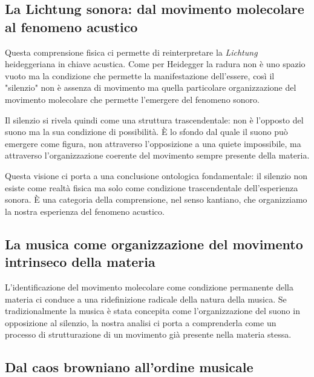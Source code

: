 \documentclass[a4paper,11pt]{article}
\begin{document}
\subsection{La Lichtung sonora: dal movimento molecolare al fenomeno acustico}\hypertarget{la-lichtung-sonora-dal-movimento-molecolare-al-fenomeno-acustico}{}\label{la-lichtung-sonora-dal-movimento-molecolare-al-fenomeno-acustico}

Questa comprensione fisica ci permette di reinterpretare la \emph{Lichtung}
heideggeriana in chiave acustica. Come per Heidegger la radura non è uno
spazio vuoto ma la condizione che permette la manifestazione
dell'essere, così il "silenzio" non è assenza di movimento ma quella
particolare organizzazione del movimento molecolare che permette
l'emergere del fenomeno sonoro.

Il silenzio si rivela quindi come una struttura trascendentale: non è
l'opposto del suono ma la sua condizione di possibilità. È lo sfondo dal
quale il suono può emergere come figura, non attraverso l'opposizione a
una quiete impossibile, ma attraverso l'organizzazione coerente del
movimento sempre presente della materia.

Questa visione ci porta a una conclusione ontologica fondamentale: il
silenzio non esiste come realtà fisica ma solo come condizione
trascendentale dell'esperienza sonora. È una categoria della
comprensione, nel senso kantiano, che organizziamo la nostra esperienza
del fenomeno acustico.



\subsection{La musica come organizzazione del movimento intrinseco della materia}\hypertarget{la-musica-come-organizzazione-del-movimento-intrinseco-della-materia}{}\label{la-musica-come-organizzazione-del-movimento-intrinseco-della-materia}

L'identificazione del movimento molecolare come condizione permanente
della materia ci conduce a una ridefinizione radicale della natura della
musica. Se tradizionalmente la musica è stata concepita come
l'organizzazione del suono in opposizione al silenzio, la nostra analisi
ci porta a comprenderla come un processo di strutturazione di un
movimento già presente nella materia stessa.

\subsection{Dal caos browniano all'ordine musicale}\hypertarget{dal-caos-browniano-allordine-musicale}{}\label{dal-caos-browniano-allordine-musicale}
\end{document}
